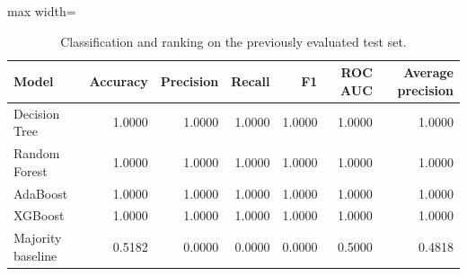 \begin{table}[H]
\centering\small
\caption{Classification and ranking on the previously evaluated test set.}
\begin{adjustbox}{max width=\linewidth}\begin{tabular}{lrrrrrr}
\toprule
Model & Accuracy & Precision & Recall & F1 & ROC AUC & Average precision \\
\midrule
Decision Tree & 1.0000 & 1.0000 & 1.0000 & 1.0000 & 1.0000 & 1.0000 \\
Random Forest & 1.0000 & 1.0000 & 1.0000 & 1.0000 & 1.0000 & 1.0000 \\
AdaBoost & 1.0000 & 1.0000 & 1.0000 & 1.0000 & 1.0000 & 1.0000 \\
XGBoost & 1.0000 & 1.0000 & 1.0000 & 1.0000 & 1.0000 & 1.0000 \\
Majority baseline & 0.5182 & 0.0000 & 0.0000 & 0.0000 & 0.5000 & 0.4818 \\
\bottomrule
\end{tabular}\end{adjustbox}
\end{table}
